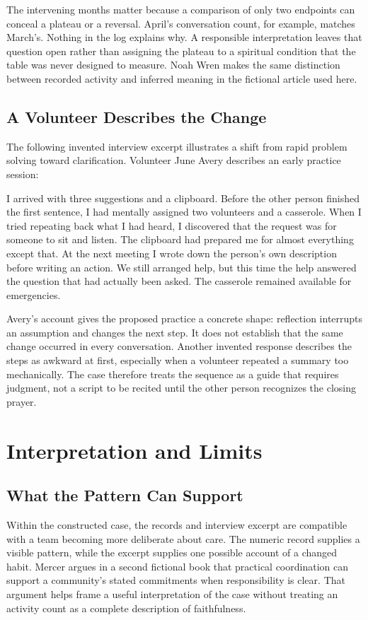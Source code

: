 \documentclass[font=termes]{mbts}
\begin{document}
The intervening months matter because a comparison of only two endpoints
can conceal a plateau or a reversal. April's conversation count, for example,
matches March's. Nothing in the log explains why. A responsible interpretation
leaves that question open rather than assigning the plateau to a spiritual
condition that the table was never designed to measure. Noah Wren makes the
same distinction between recorded activity and inferred meaning in the
fictional article used here.\autocite[49--51]{wren-measures}

\clearpage
\subsection{A Volunteer Describes the Change}
The following invented interview excerpt illustrates a shift from rapid
problem solving toward clarification. Volunteer June Avery describes an
early practice session:

\begin{mbtsquote}
I arrived with three suggestions and a clipboard. Before the other person
finished the first sentence, I had mentally assigned two volunteers and a
casserole. When I tried repeating back what I had heard, I discovered that
the request was for someone to sit and listen. The clipboard had prepared me
for almost everything except that. At the next meeting I wrote down the
person's own description before writing an action. We still arranged help,
but this time the help answered the question that had actually been asked.
The casserole remained available for emergencies.\autocite{avery-interview}
\end{mbtsquote}

Avery's account gives the proposed practice a concrete shape: reflection
interrupts an assumption and changes the next step. It does not establish
that the same change occurred in every conversation. Another invented
response describes the steps as awkward at first, especially when a
volunteer repeated a summary too mechanically. The case therefore treats
the sequence as a guide that requires judgment, not a script to be recited
until the other person recognizes the closing prayer.

\section{Interpretation and Limits}
\subsection{What the Pattern Can Support}
Within the constructed case, the records and interview excerpt are compatible
with a team becoming more deliberate about care. The numeric record supplies
a visible pattern, while the excerpt supplies one possible account of a
changed habit. Mercer argues in a second fictional book that practical
coordination can support a community's stated commitments when responsibility
is clear.\autocite[91--94]{mercer-meetings} That argument helps frame a useful
interpretation of the case without treating an activity count as a complete
description of faithfulness.
\end{document}
